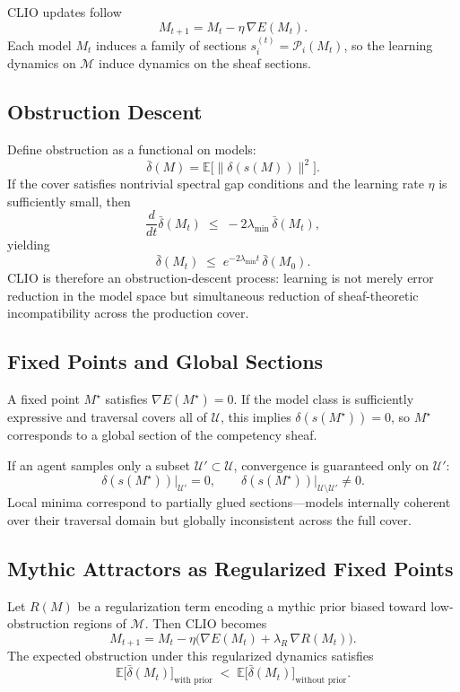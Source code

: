 \documentclass[12pt]{article}
\begin{document}
CLIO updates follow
\[
M_{t+1} = M_t - \eta\,\nabla E(M_t).
\]
Each model $M_t$ induces a family of sections $s^{(t)}_i = \mathcal{P}_i(M_t)$, so the learning dynamics on $\mathcal{M}$ induce dynamics on the sheaf sections.

\subsection{Obstruction Descent}

Define obstruction as a functional on models:
\[
\bar{\delta}(M) = \mathbb{E}\bigl[\|\delta(s(M))\|^2\bigr].
\]
If the cover satisfies nontrivial spectral gap conditions and the learning rate $\eta$ is sufficiently small, then
\[
\frac{d}{dt}\bar{\delta}(M_t) \;\le\; -2\lambda_{\min}\,\bar{\delta}(M_t),
\]
yielding
\[
\bar{\delta}(M_t) \;\le\; e^{-2\lambda_{\min} t}\,\bar{\delta}(M_0).
\]
CLIO is therefore an obstruction-descent process: learning is not merely error reduction in the model space but simultaneous reduction of sheaf-theoretic incompatibility across the production cover.

\subsection{Fixed Points and Global Sections}

A fixed point $M^\star$ satisfies $\nabla E(M^\star) = 0$. If the model class is sufficiently expressive and traversal covers all of $\mathcal{U}$, this implies $\delta(s(M^\star)) = 0$, so $M^\star$ corresponds to a global section of the competency sheaf.

If an agent samples only a subset $\mathcal{U}' \subset \mathcal{U}$, convergence is guaranteed only on $\mathcal{U}'$:
\[
\delta(s(M^\star))\big|_{\mathcal{U}'} = 0,
\qquad
\delta(s(M^\star))\big|_{\mathcal{U} \setminus \mathcal{U}'} \neq 0.
\]
Local minima correspond to partially glued sections---models internally coherent over their traversal domain but globally inconsistent across the full cover.

\subsection{Mythic Attractors as Regularized Fixed Points}

Let $R(M)$ be a regularization term encoding a mythic prior biased toward low-obstruction regions of $\mathcal{M}$. Then CLIO becomes
\[
M_{t+1} = M_t - \eta\bigl(\nabla E(M_t) + \lambda_R\,\nabla R(M_t)\bigr).
\]
The expected obstruction under this regularized dynamics satisfies
\[
\mathbb{E}\bigl[\bar{\delta}(M_t)\bigr]_{\text{with prior}}
\;<\;
\mathbb{E}\bigl[\bar{\delta}(M_t)\bigr]_{\text{without prior}}.
\]
\end{document}
